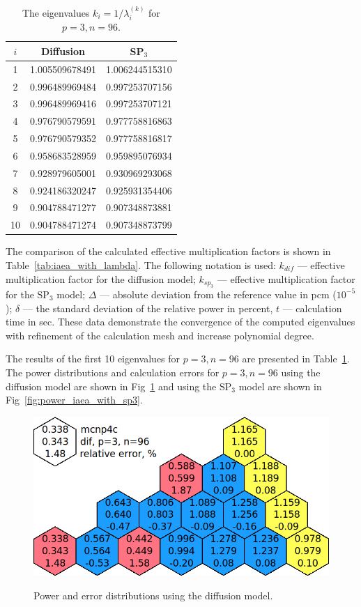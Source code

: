 \documentclass[a4paper]{jpconf}
\begin{document}
\begin{table}[htp]
\caption{The eigenvalues $k_i=1/\lambda_i^{(k)}$ for $p=3, n=96$.}
\label{tab:iaea_with_lambda_10}
\begin{center}
\begin{tabular}{c c c}
\hline
$i$ & Diffusion & SP$_3$  \\
\hline
1 & 1.005509678491 & 1.006244515310\\
2 & 0.996489969484 & 0.997253707156\\
3 & 0.996489969416 & 0.997253707121\\
4 & 0.976790579591 & 0.977758816863\\
5 & 0.976790579352 & 0.977758816817\\
6 & 0.958683528959 & 0.959895076934\\
7 & 0.928979605001 & 0.930969293068\\
8 & 0.924186320247 & 0.925931354406\\
9 & 0.904788471277 & 0.907348873881\\
10 & 0.904788471274 & 0.907348873799\\
\hline
\end{tabular}
\end{center}
\end{table}


The comparison of the calculated effective multiplication factors is shown in Table~\ref{tab:iaea_with_lambda}.
The following notation is used: $k_{dif}$ --- effective multiplication factor for the diffusion model; $k_{sp_3}$ --- effective multiplication factor for the $\mathrm{SP_3}$ model; $\Delta$ --- absolute deviation from the reference value in pcm ($10^{-5}$); $\delta$ --- the standard deviation of the relative power in percent, $t$ --- calculation time in sec.
These data demonstrate the convergence of the computed eigenvalues with refinement of the calculation mesh and increase polynomial degree. 

The results of the first 10 eigenvalues for $ p = 3, n = 96 $ are presented in Table~\ref{tab:iaea_with_lambda_10}.
The power distributions and calculation errors for $p = 3, n = 96$ using the diffusion model are shown in Fig~\ref{fig:power_iaea_with_dif} and using the $\mathrm{SP_3}$ model are shown in Fig~\ref{fig:power_iaea_with_sp3}. 

\begin{figure}[htp]
\begin{center}
	\includegraphics[width=0.7\linewidth]{dif.png}\\
	\caption{Power and error distributions using the diffusion model.}
	\label{fig:power_iaea_with_dif}
\end{center}
\end{figure}
\end{document}
